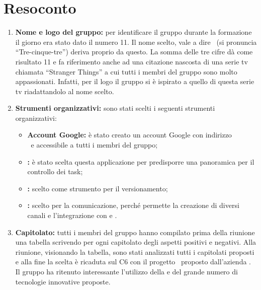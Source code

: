 \documentclass[VER-2017-12-08.tex]{subfiles}
\begin{document}
\chapter{Resoconto}
\begin{enumerate}
	\item \textbf{Nome e logo del gruppo:} per identificare il gruppo durante la formazione il giorno  era stato dato il numero 11. Il nome scelto, vale a dire \gruppo\ (si pronuncia ``Tre-cinque-tre'') deriva proprio da questo. La somma delle tre cifre dà come risultato 11 e fa riferimento anche ad una citazione nascosta di una serie tv chiamata ``Stranger Things'' a cui tutti i membri del gruppo sono molto appassionati. Infatti, per il logo il gruppo si è ispirato a quello di questa serie tv riadattandolo al nome scelto.
	\item \textbf{Strumenti organizzativi:} sono stati scelti i seguenti strumenti organizzativi:
	\begin{itemize}
		\item \textbf{Account Google:} è stato creato un account Google con indirizzo\\ \mailgroup\ e accessibile a tutti i membri del gruppo;
		\item \textbf{:} è stato scelta questa applicazione per predisporre una panoramica per il controllo dei task;
		\item \textbf{:} scelto come strumento per il versionamento;
		\item \textbf{:} scelto per la comunicazione, perché permette la creazione di diversi canali e l'integrazione con  e .
	\end{itemize}
	\item \textbf{Capitolato:} tutti i membri del gruppo hanno compilato prima della riunione una tabella scrivendo per ogni capitolato degli aspetti positivi e negativi. Alla riunione, visionando la tabella, sono stati analizzati tutti i capitolati proposti e alla fine la scelta è ricaduta sul C6 con il progetto \progetto\ proposto dall'azienda \Proponente. Il gruppo ha ritenuto interessante l'utilizzo della   e del grande numero di tecnologie innovative proposte. 
\end{enumerate} 
\end{document}
